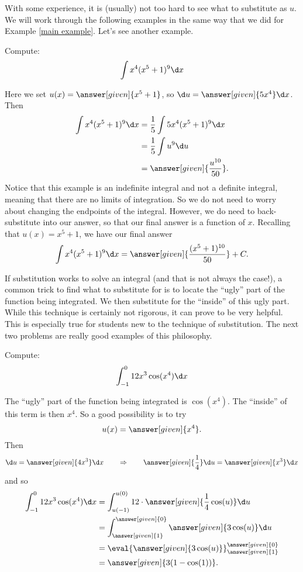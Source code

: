 \documentclass{ximera}
\begin{document}
With some experience, it is (usually) not too hard to see what to
substitute as $u$.  We will work through the following examples in the
same way that we did for Example \ref{main example}. Let's see another
example.

\begin{example}
Compute:
\[
\int x^4(x^5+1)^{9} \d x
\]
\begin{explanation}
Here we set $u(x) =  \answer[given]{x^5+1}$, so $\d u =  \answer[given]{5x^4} \d x$.  Then
\begin{align*}
  \int x^4(x^5+1)^{9} \d x &= \frac{1}{5} \int 5x^4 (x^5+1)^{9} \d x \\
  &= \frac{1}{5} \int u^{9} \d u\\
&= \answer[given]{\frac{u^{10}}{50}}.
\end{align*}
Notice that this example is an indefinite integral and not a definite
integral, meaning that there are no limits of integration.  So we do
not need to worry about changing the endpoints of the integral.  However,
we do need to back-substitute into our answer, so that our final
answer is a function of $x$.  Recalling that $u(x) = x^5+1$, we have
our final answer
\[
\int x^4(x^5+1)^{9} \d x= \answer[given]{\frac{(x^5+1)^{10}}{50}}+C.
\]
\end{explanation}
\end{example}


If substitution works to solve an integral (and that is not always the
case!), a common trick to find what to substitute for is to locate the
``ugly'' part of the function being integrated.  We then substitute
for the ``inside'' of this ugly part.  While this technique is
certainly not rigorous, it can prove to be very helpful.  This is
especially true for students new to the technique of substitution.
The next two problems are really good examples of this philosophy.

\begin{example}
Compute:
\[
\int_{-1}^0 12x^3 \cos(x^4) \d x
\]
\begin{explanation}
The ``ugly'' part of the function being integrated is $\cos(x^4)$.  The
``inside'' of this term is then $x^4$.  So a good possibility is to
try
\[
u(x) =  \answer[given]{x^4}.
\]
Then
\[
\d u =  \answer[given]{4x^3} \d x 	\qquad	\Rightarrow	\qquad	\answer[given]{\frac{1}{4}} \d u = \answer[given]{x^3}\d x
\]
and so
\begin{align*}
\int_{-1}^0 12x^3 \cos(x^4) \d x &= \int_{u(-1)}^{u(0)} 12 \cdot\answer[given]{\frac{1}{4}\cos(u)} \d u  \\
&= \int_{\answer[given]{1}}^{\answer[given]{0}} \answer[given]{3 \cos(u)} \d u  \\
&= \eval{\answer[given]{3\cos(u)}}_{\answer[given]{1}}^{\answer[given]{0}}  \\
&= \answer[given]{3(1-\cos(1))}.
\end{align*}
\end{explanation}
\end{example}
\end{document}

